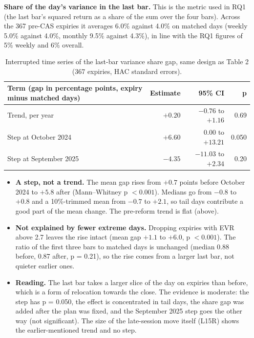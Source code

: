 \documentclass[10pt,a4paper]{article}
\begin{document}
\textbf{Share of the day's variance in the last bar.} This is the metric used in RQ1 (the last bar's squared return as a share of the sum over the four bars). Across the 367 pre-CAS expiries it averages 6.0\% against 4.0\% on matched days (weekly 5.0\% against 4.0\%, monthly 9.5\% against 4.3\%), in line with the RQ1 figures of 5\% weekly and 6\% overall.
\begin{table}[h!]\centering\small
\begin{tabular}{lrrr}
\toprule
Term (gap in percentage points, expiry minus matched days) & Estimate & 95\% CI & p\\
\midrule
Trend, per year & $+0.20$ & $-0.76$ to $+1.16$ & 0.69\\
Step at October 2024 & $+6.60$ & $0.00$ to $+13.21$ & 0.050\\
Step at September 2025 & $-4.35$ & $-11.03$ to $+2.34$ & 0.20\\
\bottomrule
\end{tabular}
\caption{Interrupted time series of the last-bar variance share gap, same design as Table 2 (367 expiries, HAC standard errors).}
\end{table}
\begin{itemize}
\item \textbf{A step, not a trend.} The mean gap rises from $+0.7$ points before October 2024 to $+5.8$ after (Mann--Whitney p $<0.001$). Medians go from $-0.8$ to $+0.8$ and a 10\%-trimmed mean from $-0.7$ to $+2.1$, so tail days contribute a good part of the mean change. The pre-reform trend is flat (above).
\item \textbf{Not explained by fewer extreme days.} Dropping expiries with EVR above 2.7 leaves the rise intact (mean gap $+1.1$ to $+6.0$, p $<0.001$). The ratio of the first three bars to matched days is unchanged (median 0.88 before, 0.87 after, p = 0.21), so the rise comes from a larger last bar, not quieter earlier ones.
\item \textbf{Reading.} The last bar takes a larger slice of the day on expiries than before, which is a form of relocation towards the close. The evidence is moderate: the step has p = 0.050, the effect is concentrated in tail days, the share gap was added after the plan was fixed, and the September 2025 step goes the other way (not significant). The size of the late-session move itself (L15R) shows the earlier-mentioned trend and no step.
\end{itemize}
\end{document}
